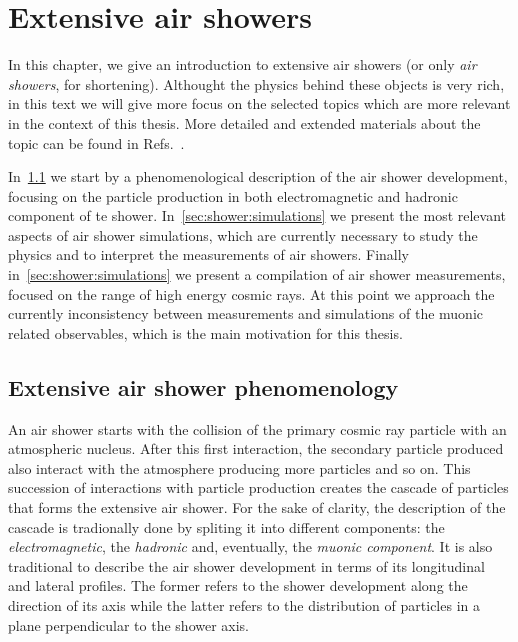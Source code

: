 \chapter[Extensive air showers and UHECR composition]{Extensive air showers}
\label{sec:showers}

In this chapter, we give an introduction to extensive air showers
(or only \emph{air showers}, for shortening).
Althought the physics behind these objects is very rich,
in this text we will give more focus on the selected topics
which are more relevant in the context of this thesis.
More detailed and extended materials about the topic can be found
in Refs.~\cite{GaisserBook,GriederBook}.

In~\cref{sec:showers:phen} we start by a phenomenological description
of the air shower development, focusing on the particle production in
both electromagnetic and hadronic component of te shower. 
In~\cref{sec:shower:simulations} we present the most relevant aspects
of air shower simulations, which are currently necessary to study
the  physics and to interpret the measurements of air showers.
Finally in~\cref{sec:shower:simulations} we present a compilation
of air shower measurements, focused on the range of high energy cosmic rays.
At this point we approach the currently inconsistency between measurements and
simulations of the muonic related observables, which is the main motivation
for this thesis.


\section{Extensive air shower phenomenology}
\label{sec:showers:phen}

An air shower starts with the collision of the primary cosmic ray particle
with an atmospheric nucleus. After this first interaction, the secondary
particle produced also interact with the atmosphere producing more
particles and so on. This succession of interactions with particle production
creates the cascade of particles that forms the extensive air shower.
For the sake of clarity, the description of the cascade is tradionally
done by spliting it into different components: the \emph{electromagnetic},
the \emph{hadronic} and, eventually, the \emph{muonic component}. It is also traditional
to describe the air shower development in terms of its longitudinal and lateral profiles.
The former refers to the shower development along the direction of its axis
while the latter refers to the distribution of particles
in a plane perpendicular to the shower axis.


